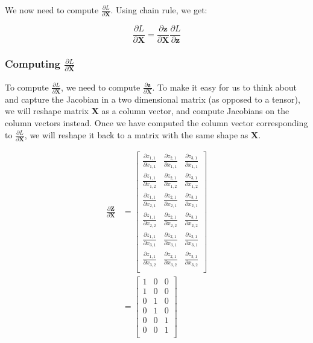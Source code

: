 \documentclass{article}
\newcommand{\vecr}[1]{\bm{#1}}
\newcommand{\matr}[1]{\mathbf{#1}} %
\begin{document}
We now need to compute $\frac{\partial L}{\partial \matr{X}}$. Using chain rule, we get:

\begin{equation} \label{dX_sum_along_axis_1}
\frac{\partial L}{\partial \matr{X}} = \frac{\partial \vecr{z}}{\partial \matr{X}}\frac{\partial L}{\partial \vecr{z}}
\end{equation}

\subsubsection{Computing $\frac{\partial L}{\partial \matr{X}}$}
To compute $\frac{\partial L}{\partial \matr{X}}$, we need to compute $\frac{\partial \vecr{z}}{\partial \matr{X}}$. To make it easy for us to think about and capture the Jacobian in a two dimensional matrix (as opposed to a tensor), we will reshape matrix $\matr{X}$ as a column vector, and compute Jacobians on the column vectors instead. Once we have computed the column vector corresponding to $\frac{\partial L}{\partial \matr{X}}$, we will reshape it back to a matrix with the same shape as $\matr{X}$.

\begin{align}
\frac{\partial \matr{Z}}{\partial \matr{X}} &=
\begin{bmatrix}
\frac{\partial z_{1,1}}{\partial x_{1,1}} & \frac{\partial z_{2,1}}{\partial x_{1,1}} & \frac{\partial z_{3,1}}{\partial x_{1,1}}\\[0.7em]
\frac{\partial z_{1,1}}{\partial x_{1,2}} & \frac{\partial z_{2,1}}{\partial x_{1,2}} & \frac{\partial z_{3,1}}{\partial x_{1,2}} \\[0.7em]
\frac{\partial z_{1,1}}{\partial x_{2,1}} & \frac{\partial z_{2,1}}{\partial x_{2,1}} & \frac{\partial z_{3,1}}{\partial x_{2,1}} \\[0.7em]
\frac{\partial z_{1,1}}{\partial x_{2,2}} & \frac{\partial z_{2,1}}{\partial x_{2,2}} & \frac{\partial z_{3,1}}{\partial x_{2,2}} \\[0.7em]
\frac{\partial z_{1,1}}{\partial x_{3,1}} & \frac{\partial z_{2,1}}{\partial x_{3,1}} & \frac{\partial z_{3,1}}{\partial x_{3,1}} \\[0.7em]
\frac{\partial z_{1,1}}{\partial x_{3,2}} & \frac{\partial z_{2,1}}{\partial x_{3,2}} & \frac{\partial z_{3,1}}{\partial x_{3,2}} \\[0.7em]
\end{bmatrix} \nonumber
\\ \label{dZbydX_sum_along_axis_1}
&=
\begin{bmatrix}
1 & 0 & 0 \\%
1 & 0 & 0 \\%
0 & 1 & 0 \\%
0 & 1 & 0 \\%
0 & 0 & 1 \\%
0 & 0 & 1 \\%
\end{bmatrix}
\end{align}
\end{document}
